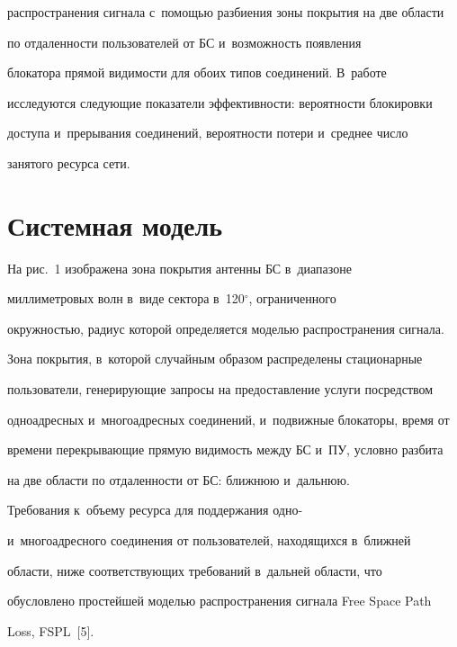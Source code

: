 распространения сигнала с~по\-мощью разбиения зоны покрытия на две области 

по от\-да\-лен\-ности пользователей от БС и~возможность появления 

блокатора прямой ви\-ди\-мости для обоих типов соединений. В~работе 

ис\-сле\-ду\-ют\-ся сле\-ду\-ющие показатели эф\-фек\-тив\-ности: вероятности блокировки 

доступа и~прерывания соединений, вероятности потери и~сред\-нее чис\-ло 

занятого ресурса сети. 





\section{Системная модель }



  На рис.~1 изображена зона покрытия антенны БС в~диапазоне 

мил\-ли\-мет\-ро\-вых волн в~виде сектора в~120$^\circ$, ограниченного 

окруж\-ностью, радиус которой определяется мо\-делью распространения сигнала. 

Зона покрытия, в~которой случайным образом распределены стационарные 

пользователи, ге\-не\-ри\-ру\-ющие запросы на предостав\-ле\-ние услуги по\-сред\-ст\-вом 

одноадресных и~многоадресных соединений, и~подвижные блокаторы, время от 

времени пе\-ре\-кры\-ва\-ющие прямую ви\-ди\-мость между БС и~ПУ, услов\-но разбита 

на две области по отдаленности от БС: ближ\-нюю и~даль\-нюю.

  

  Требования к~объему ресурса для поддержания одно- 

и~многоадресного со\-еди\-не\-ния от пользователей, находящихся в~ближ\-ней 

об\-ласти, ниже со\-от\-вет\-ст\-ву\-ющих требований в~дальней об\-ласти, что 

обуслов\-ле\-но простейшей моделью распространения сигнала Free Space Path 

Loss, FSPL~[5].

  

